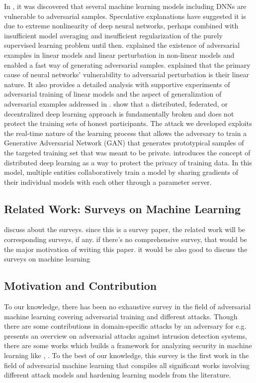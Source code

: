 \documentclass[a4paper]{article}
\newcommand{\ach}[1]{{\color{red}#1}}
\begin{document}
In \cite{szegedy2013intriguing}, it was discovered that several machine learning models including DNNs are vulnerable to adversarial samples. Speculative explanations have suggested it is due to extreme nonlinearity of deep neural networks, perhaps combined with insufficient model averaging and insufficient regularization of the purely supervised
learning problem until then. \cite{szegedy2013intriguing} explained the existence of adversarial examples in linear models and linear perturbation in non-linear models and enabled a fast way of generating adversarial samples. \cite{goodfellow2014explaining} explained that the  primary cause of neural networks’ vulnerability to adversarial perturbation is their linear nature. It also provides a detailed analysis with supportive experiments of adversarial training of linear models and the aspect of generalization of adversarial examples addressed in \cite{papernot2016transferability}. \cite{hitaj2017deep} show that a distributed, federated, or decentralized deep learning approach is fundamentally broken and does not protect the training sets of honest participants. The attack we developed exploits the real-time nature of the learning process that allows the adversary to train a Generative Adversarial Network (GAN) that generates prototypical samples of the targeted training set that was meant to be private. \cite{abadi2016deep} introduces the concept of distributed deep learning as a way to protect the privacy of training data. In this model, multiple entities collaboratively train a model by sharing gradients of their individual models with each other through a parameter server.

\subsection{Related Work: Surveys on Machine Learning}
\ach{discuss about the surveys. since this is a survey paper, the related work will be corresponding surveys, if any. if there's no comprehensive survey, that would be the major motivation of writing this paper. it would be also good to discuss the surveys on machine learning}

\subsection{Motivation and Contribution}
To our knowledge, there has been no exhaustive survey in the field of adversarial machine learning covering adversarial training and different attacks. Though there are some contributions in domain-specific attacks by an adversary for e.g. \cite{corona2013adversarial} presents an overview on adversarial attacks against intrusion detection systems, there are some works which builds a framework for analyzing security in machine learning like \cite{biggio2014security}, \cite{barreno2006can}. To the best of our knowledge, this survey is the first work in the field of adversarial machine learning that compiles all significant works involving different attack models and hardening learning models from the literature.
\end{document}

